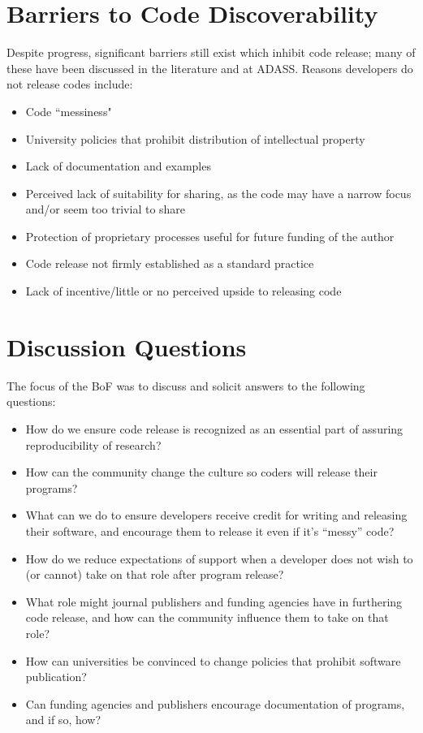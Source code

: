 \section{Barriers to Code Discoverability}

Despite progress, significant barriers still exist which inhibit code release; many of these have been discussed in the literature and at ADASS. Reasons developers do not release codes include:

\begin{itemize}
\item Code ``messiness" \citep{barnes2010}
\item University policies that prohibit distribution of intellectual property
\item Lack of documentation and examples
\item Perceived lack of suitability for sharing, as the code may have a narrow focus and/or seem too trivial to share
\item Protection of proprietary processes useful for future funding of the author
\item Code release not firmly established as a standard practice
\item Lack of incentive/little or no perceived upside to releasing code
\end{itemize}

\section{Discussion Questions}

The focus of the BoF was to discuss and solicit answers to the following questions:

\begin{itemize}
\item How do we ensure code release is recognized as an essential part of assuring reproducibility of research?
\item How can the community change the culture so coders will release their programs?
\item What can we do to ensure developers receive credit for writing and releasing their software, and encourage them to release it even if it's ``messy'' code?
\item How do we reduce expectations of support when a developer does not wish to (or cannot) take on that role after program release?
\item What role might journal publishers and funding agencies have in furthering code release, and how can the community influence them to take on that role?
\item How can universities be convinced to change policies that prohibit software publication?
\item Can funding agencies and publishers encourage documentation of programs, and if so, how?
\end{itemize}

